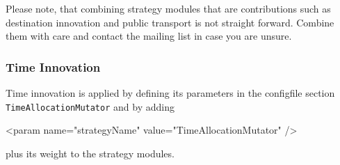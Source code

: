 Please note, that combining strategy modules that are \glspl{contribution} such as destination innovation and public transport is not straight forward. Combine them with care and contact the mailing list in case you are unsure.

%


\subsubsection{Time Innovation}
\label{sec:timechoice}
Time innovation is applied by defining its parameters in the \gls{configfile} section \lstinline|TimeAllocationMutator| and by adding 
%
\begin{xml}
	<param name="strategyName" value="TimeAllocationMutator" />
\end{xml}
%
plus its weight to the strategy modules.

